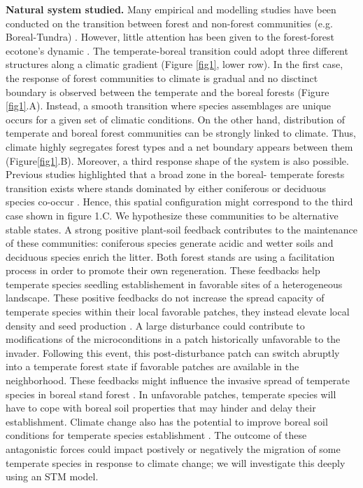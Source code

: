 \textbf{Natural system studied.} Many empirical and modelling studies have
been conducted on the transition between forest and non-forest communities
(e.g. Boreal-Tundra) \cite{Scheffer2012,Scheffer2001,Hirota2011,Messaoud2007}.
However, little attention has been given to the forest-forest
ecotone's dynamic \cite{Goldblum2010,Graignic2013,Messaoud2007}.  The
temperate-boreal transition could adopt three different structures along a
climatic gradient (Figure \ref{fig1}, lower row). In the first case, the
response of forest communities to climate is gradual and no disctinct boundary
is observed between the temperate and the boreal forests (Figure
\ref{fig1}.A). Instead, a smooth transition where species assemblages are
unique occurs for a given set of climatic conditions. On the other hand,
distribution of temperate and boreal forest communities can be strongly linked
to climate. Thus, climate highly segregates forest types and a net boundary
appears between them (Figure\ref{fig1}.B).  Moreover, a third response shape
of the system is also possible. Previous studies highlighted that a broad zone
in the boreal- temperate forests transition exists where stands dominated by
either coniferous or deciduous species co-occur
\cite{Goldblum2010,Fisichelli2013}. Hence, this spatial configuration might
correspond to the third case shown in figure 1.C. We hypothesize these
communities to be alternative stable states. A strong positive plant-soil
feedback contributes to the maintenance of these communities: coniferous
species generate acidic and wetter soils and deciduous species enrich the
litter. Both forest stands are using a facilitation process in order to
promote their own regeneration.  These feedbacks help temperate species
seedling establishement in favorable sites of a heterogeneous landscape.
These positive feedbacks do not increase the spread capacity of temperate
species within their local favorable patches, they instead elevate local
density and seed production \cite{Levine2006}. A large disturbance could
contribute to modifications of the microconditions in a patch historically unfavorable
to the invader. Following this event, this post-disturbance patch can switch
abruptly into a temperate forest state if favorable patches are available in
the neighborhood. These  feedbacks might influence the invasive spread of
temperate species in boreal stand forest \cite{Levine2006}. In unfavorable
patches, temperate species will have to cope with boreal soil properties that
may hinder and delay their establishment. Climate change also has the
potential to improve boreal soil conditions for temperate species
establishment \cite{Lafleur2010}. The outcome of these antagonistic forces
could impact postively or negatively the migration of some temperate species
in response to climate change; we will investigate this deeply using an STM model. 


